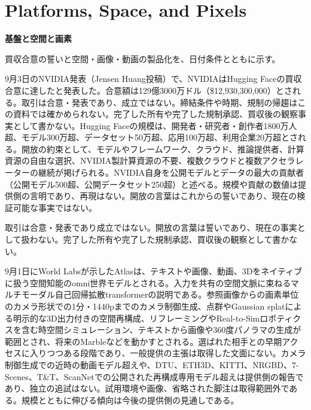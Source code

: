 \section{Platforms, Space, and Pixels}
\begin{wideflow}
{\Large\bfseries 基盤と空間と画素}\par
\smallskip
{\color{SurveyMuted}買収合意の誓いと空間・画像・動画の製品化を、日付条件とともに示す。}\par
\end{wideflow}

9月3日のNVIDIA発表（Jensen Huang投稿）で、NVIDIAはHugging Faceの買収合意に達したと発表した\cite{nvidiahf}。合意額は129億3000万ドル（\$12,930,300,000）とされる。取引は合意・発表であり、成立ではない。締結条件や時期、規制の帰趨はこの資料では確かめられない。完了した所有や完了した規制承認、買収後の観察事実として書かない。Hugging Faceの規模は、開発者・研究者・創作者1800万人超、モデル300万超、データセット50万超、応用100万超、利用企業20万超とされる。開放の約束として、モデルやフレームワーク、クラウド、推論提供者、計算資源の自由な選択、NVIDIA製計算資源の不要、複数クラウドと複数アクセラレーターの継続が掲げられる。NVIDIA自身を公開モデルとデータの最大の貢献者（公開モデル500超、公開データセット250超）と述べる。規模や貢献の数値は提供側の言明であり、再現はない。開放の言葉はこれからの誓いであり、現在の検証可能な事実ではない。

\begin{claimboundary}[合意と成立の境界]
取引は合意・発表であり成立ではない。開放の言葉は誓いであり、現在の事実として扱わない。完了した所有や完了した規制承認、買収後の観察として書かない。
\end{claimboundary}

9月1日にWorld Labsが示したAtlasは、テキストや画像、動画、3Dをネイティブに扱う空間知能のomni世界モデルとされる\cite{atlas}。入力を共有の空間文脈に束ねるマルチモーダル自己回帰拡散transformerの説明である。参照画像からの画素単位のカメラ形状での1分・1440pまでのカメラ制御生成、点群やGaussian splatによる明示的な3D出力付きの空間再構成、リフレーミングやReal-to-Simロボティクスを含む時空間シミュレーション、テキストから画像や360度パノラマの生成が範囲とされ、将来のMarbleなどを動かすとされる。選ばれた相手との早期アクセスに入りつつある段階であり、一般提供の主張は取得した文面にない。カメラ制御生成での近時の動画モデル超えや、DTU、ETH3D、KITTI、NRGBD、7-Scenes、T\&T、ScanNetでの公開された再構成専用モデル超えは提供側の報告であり、独立の追試はない。試用環境や画像、省略された脚注は取得範囲外である。規模とともに伸びる傾向は今後の提供側の見通しである。


